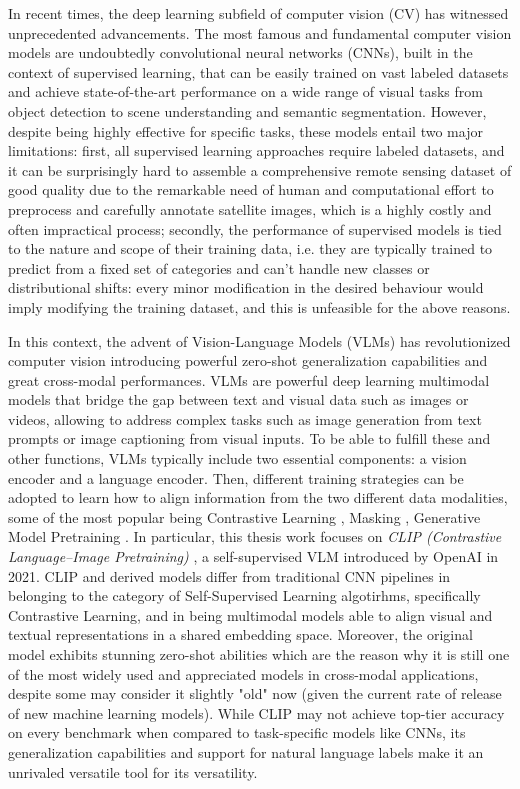 \documentclass[a4paper, oneside, english]{sapthesis} %
\begin{document}
In recent times, the deep learning subfield of computer vision (CV) has witnessed unprecedented advancements. The most famous and fundamental computer vision models are undoubtedly convolutional neural networks (CNNs), built in the context of supervised learning, that can be easily trained on vast labeled datasets and achieve state-of-the-art performance on a wide range of visual tasks from object detection to scene understanding and semantic segmentation. However, despite being highly effective for specific tasks, these models entail two major limitations: first, all supervised learning approaches require labeled datasets, and it can be surprisingly hard to assemble a comprehensive remote sensing dataset of good quality due to the remarkable need of human and computational effort to preprocess and carefully annotate satellite images, which is a highly costly and often impractical process; secondly, the performance of supervised models is tied to the nature and scope of their training data, i.e. they are typically trained to predict from a fixed set of categories and can't handle new classes or distributional shifts: every minor modification in the desired behaviour would imply modifying the training dataset, and this is unfeasible for the above reasons.

In this context, the advent of Vision-Language Models (VLMs) has revolutionized computer vision \cite{marimo2025beyond} introducing powerful zero-shot generalization capabilities and great cross-modal performances. VLMs are powerful deep learning multimodal models that bridge the gap between text and visual data such as images or videos, allowing to address complex tasks such as image generation from text prompts or image captioning from visual inputs. To be able to fulfill these and other functions, VLMs typically include two essential components: a vision encoder and a language encoder. Then, different training strategies can be adopted to learn how to align information from the two different data modalities, some of the most popular being Contrastive Learning \cite{radford2021learning} \cite{chen2020simple} \cite{he2020momentum} \cite{jia2021scaling}, Masking \cite{singh2022flava}, Generative Model Pretraining \cite{ramesh2022hierarchical} \cite{rombach2022high} \cite{saharia2022photorealistic} \cite{alayrac2022flamingo}. In particular, this thesis work focuses on \emph{CLIP (Contrastive Language–Image Pretraining)} \cite{radford2021learning}, a self-supervised VLM introduced by OpenAI in 2021. CLIP and derived models differ from traditional CNN pipelines in belonging to the category of Self-Supervised Learning algotirhms, specifically Contrastive Learning, and in being multimodal models able to align visual and textual representations in a shared embedding space. Moreover, the original model exhibits stunning zero-shot abilities which are the reason why it is still one of the most widely used and appreciated models in cross-modal applications, despite some may consider it slightly "old" now (given the current rate of release of new machine learning models). While CLIP may not achieve top-tier accuracy on every benchmark when compared to task-specific models like CNNs, its generalization capabilities and support for natural language labels make it an unrivaled versatile tool for its versatility.
\end{document}
